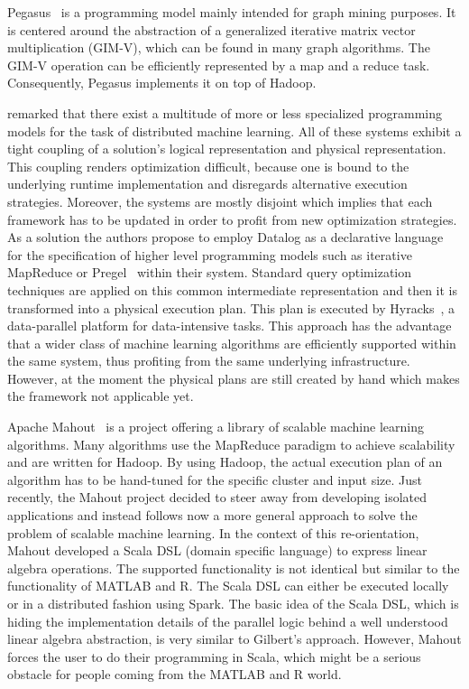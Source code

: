 Pegasus~\cite{kang:2009a} is a programming model mainly intended for graph mining purposes.
It is centered around the abstraction of a generalized iterative matrix vector multiplication (GIM-V), which can be found in many graph algorithms.
The GIM-V operation can be efficiently represented by a map and a reduce task.
Consequently, Pegasus implements it on top of Hadoop.

\cite{bu:apa2012a} remarked that there exist a multitude of more or less specialized programming models for the task of distributed machine learning.
All of these systems exhibit a tight coupling of a solution's logical representation and physical representation.
This coupling renders optimization difficult, because one is bound to the underlying runtime implementation and disregards alternative execution strategies.
Moreover, the systems are mostly disjoint which implies that each framework has to be updated in order to profit from new optimization strategies.
As a solution the authors propose to employ Datalog as a declarative language for the specification of higher level programming models such as iterative MapReduce or Pregel~\cite{malewicz:2010a} within their system.
Standard query optimization techniques are applied on this common intermediate representation and then it is transformed into a physical execution plan.
This plan is executed by Hyracks~\cite{borkar:2011a}, a data-parallel platform for data-intensive tasks.
This approach has the advantage that a wider class of machine learning algorithms are efficiently supported within the same system, thus profiting from the same underlying infrastructure.
However, at the moment the physical plans are still created by hand which makes the framework not applicable yet.

Apache Mahout~\cite{mahout:2011a} is a project offering a library of scalable machine learning algorithms.
Many algorithms use the MapReduce paradigm to achieve scalability and are written for Hadoop.
By using Hadoop, the actual execution plan of an algorithm has to be hand-tuned for the specific cluster and input size.
Just recently, the Mahout project decided to steer away from developing isolated applications and instead follows now a more general approach to solve the problem of scalable machine learning.
In the context of this re-orientation, Mahout developed a Scala DSL (domain specific language) to express linear algebra operations.
The supported functionality is not identical but similar to the functionality of MATLAB and R.
The Scala DSL can either be executed locally or in a distributed fashion using Spark.
The basic idea of the Scala DSL, which is hiding the implementation details of the parallel logic behind a well understood linear algebra abstraction, is very similar to Gilbert's approach.
However, Mahout forces the user to do their programming in Scala, which might be a serious obstacle for people coming from the MATLAB and R world. 

